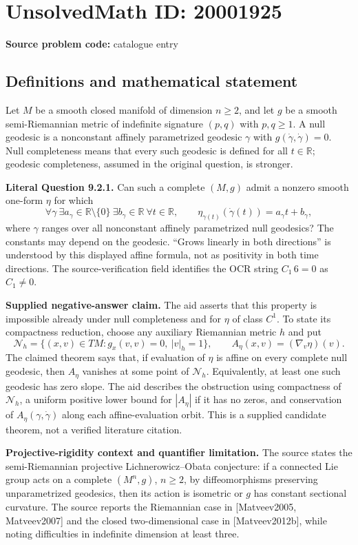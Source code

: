 \documentclass[11pt]{article}
\newcommand{\R}{\mathbb{R}}
\begin{document}
\section*{UnsolvedMath ID: 20001925}
\textbf{Source problem code:} catalogue entry
\subsection{Definitions and mathematical statement}
Let $M$ be a smooth closed manifold of dimension $n\ge2$, and let $g$ be a smooth semi-Riemannian metric of indefinite signature $(p,q)$ with $p,q\ge1$. A null geodesic is a nonconstant affinely parametrized geodesic $\gamma$ with $g(\dot\gamma,\dot\gamma)=0$. Null completeness means that every such geodesic is defined for all $t\in\R$; geodesic completeness, assumed in the original question, is stronger.

\textbf{Literal Question 9.2.1.} Can such a complete $(M,g)$ admit a nonzero smooth one-form $\eta$ for which
\[
 \forall\gamma\ \exists a_\gamma\in\R\setminus\{0\}\ 
 \exists b_\gamma\in\R\ \forall t\in\R,
 \qquad \eta_{\gamma(t)}(\dot\gamma(t))=a_\gamma t+b_\gamma,
\]
where $\gamma$ ranges over all nonconstant affinely parametrized null geodesics? The constants may depend on the geodesic. ``Grows linearly in both directions'' is understood by this displayed affine formula, not as positivity in both time directions. The source-verification field identifies the OCR string $C_1\,6=0$ as $C_1\ne0$.

\textbf{Supplied negative-answer claim.} The aid asserts that this property is impossible already under null completeness and for $\eta$ of class $C^1$. To state its compactness reduction, choose any auxiliary Riemannian metric $h$ and put
\[
 \mathcal N_h=\{(x,v)\in TM:g_x(v,v)=0,\ |v|_h=1\},
 \qquad A_\eta(x,v)=(\nabla_v\eta)(v).
\]
The claimed theorem says that, if evaluation of $\eta$ is affine on every complete null geodesic, then $A_\eta$ vanishes at some point of $\mathcal N_h$. Equivalently, at least one such geodesic has zero slope. The aid describes the obstruction using compactness of $\mathcal N_h$, a uniform positive lower bound for $|A_\eta|$ if it has no zeros, and conservation of $A_\eta(\gamma,\dot\gamma)$ along each affine-evaluation orbit. This is a supplied candidate theorem, not a verified literature citation.

\textbf{Projective-rigidity context and quantifier limitation.} The source states the semi-Riemannian projective Lichnerowicz--Obata conjecture: if a connected Lie group acts on a complete $(M^n,g)$, $n\ge2$, by diffeomorphisms preserving unparametrized geodesics, then its action is isometric or $g$ has constant sectional curvature. The source reports the Riemannian case in [Matveev2005, Matveev2007] and the closed two-dimensional case in [Matveev2012b], while noting difficulties in indefinite dimension at least three.
\end{document}
